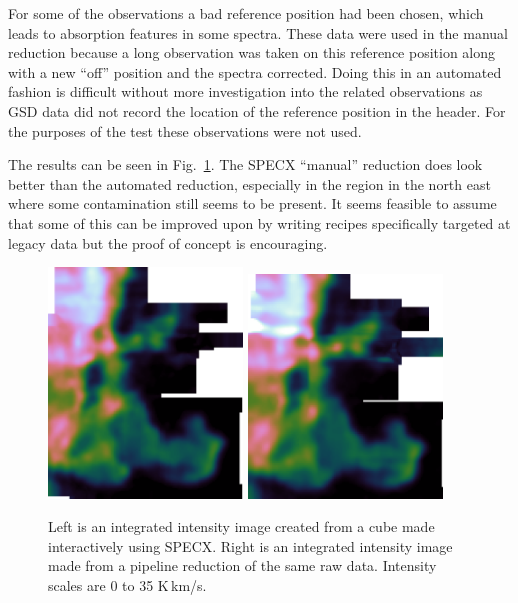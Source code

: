 \documentclass[final,authoryear,5p,times,twocolumn]{elsarticle}
\begin{document}
For some of the observations a bad reference position had been chosen,
which leads to absorption features in some spectra. These data were
used in the manual reduction because a long observation was taken on
this reference position along with a new ``off'' position and the
spectra corrected. Doing this in an automated fashion is difficult
without more investigation into the related observations as GSD data
did not record the location of the reference position in the
header. For the purposes of the test these observations were not used.

The results can be seen in Fig.\ \ref{fig:hhcmp}. The SPECX ``manual''
reduction does look better than the automated reduction, especially in
the region in the north east where some contamination still seems to
be present. It seems feasible to assume that some of this can be
improved upon by writing recipes specifically targeted at legacy data
but the proof of concept is encouraging.

\begin{figure}
\begin{minipage}{\textwidth}
\centering
\includegraphics[width=0.46\textwidth]{horsehead-specx}
\includegraphics[width=0.46\textwidth]{horsehead-pipeline}
\caption{Left is an integrated intensity image created from
  a cube made interactively using SPECX. Right is an
  integrated intensity image made from a pipeline reduction of the
  same raw data. Intensity scales are 0 to 35 K\,km/s.}
\label{fig:hhcmp}
\end{minipage}
\end{figure}
\end{document}
